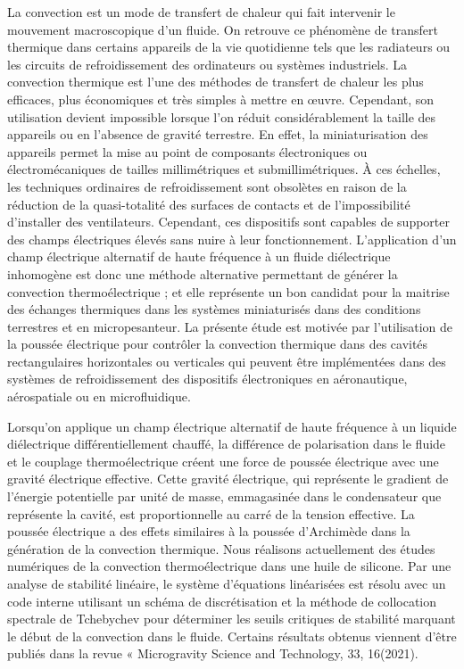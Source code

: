 {\normalsize
La convection est un mode de transfert de chaleur qui fait intervenir le mouvement macroscopique d'un fluide. On retrouve ce phénomène de transfert thermique dans certains appareils de la vie quotidienne tels que les radiateurs ou les circuits de refroidissement des ordinateurs ou systèmes industriels. La convection thermique est l'une des méthodes de transfert de chaleur les plus efficaces, plus économiques et très simples à mettre en œuvre. Cependant, son utilisation devient impossible lorsque l'on réduit considérablement la taille des appareils ou en l'absence de gravité terrestre. En effet, la miniaturisation des appareils permet la mise au point de composants électroniques ou électromécaniques de tailles millimétriques et submillimétriques. À ces échelles, les techniques ordinaires de refroidissement sont obsolètes en raison de la réduction de la quasi-totalité des surfaces de contacts et de l'impossibilité d'installer des ventilateurs. Cependant, ces dispositifs sont capables de supporter des champs électriques élevés sans nuire à leur fonctionnement. L'application d'un champ électrique alternatif de haute fréquence à un fluide diélectrique inhomogène est donc une méthode alternative permettant de générer la convection thermoélectrique ; et elle représente un bon candidat pour la maitrise des échanges thermiques dans les systèmes miniaturisés dans des conditions terrestres et en micropesanteur. La présente étude est motivée par l'utilisation de la poussée électrique pour contrôler la convection thermique dans des cavités rectangulaires horizontales ou verticales qui peuvent être implémentées dans des systèmes de refroidissement des dispositifs électroniques en aéronautique, aérospatiale ou en microfluidique.



Lorsqu'on applique un champ électrique alternatif de haute fréquence à un liquide diélectrique différentiellement chauffé, la différence de polarisation dans le fluide et le couplage thermoélectrique créent une force de poussée électrique avec une gravité électrique effective. Cette gravité électrique, qui représente le gradient de l'énergie potentielle par unité de masse, emmagasinée dans le condensateur que représente la cavité, est proportionnelle au carré de la tension effective. La poussée électrique a des effets similaires à la poussée d'Archimède dans la génération de la convection thermique. Nous réalisons actuellement des études numériques de la convection thermoélectrique dans une huile de silicone. Par une analyse de stabilité linéaire, le système d'équations linéarisées est résolu avec un code interne utilisant un schéma de discrétisation et la méthode de collocation spectrale de Tchebychev pour déterminer les seuils critiques de stabilité marquant le début de la convection dans le fluide. Certains résultats obtenus viennent d'être publiés dans la revue « Microgravity Science and Technology, 33, 16(2021).



}
